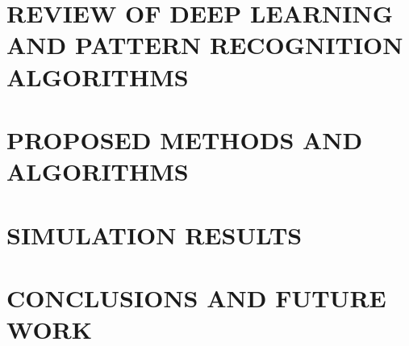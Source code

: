 \documentclass[14pt,epsfig,times]{report}
\begin{document}
\chapter{REVIEW OF DEEP LEARNING AND PATTERN RECOGNITION ALGORITHMS}\label{ch3}


\chapter{PROPOSED METHODS AND ALGORITHMS}\label{ch4}


\chapter{SIMULATION RESULTS}\label{ch5}


\chapter{CONCLUSIONS AND FUTURE WORK}\label{ch6}

%

%
\end{document}
